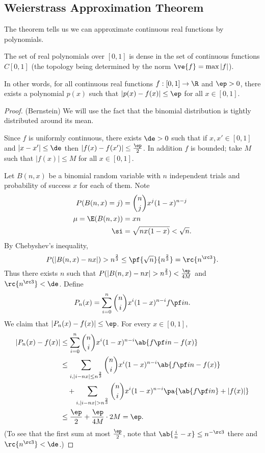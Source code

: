 
\subsection{Weierstrass Approximation Theorem}
The theorem tells us we can approximate continuous real functions by polynomials.
\begin{thm}
The set of real polynomials over $[0,1]$ is dense in the set of continuous functions $C[0,1]$ (the topology being determined by the norm $\ve{f}=\max|f|$).

In other words, for all continuous real functions $f:[0,1]\to \R$ and $\ep>0$, there exists a polynomial $p(x)$ such that $|p(x)-f(x)|\le \ep$ for all $x\in [0,1]$.
\end{thm}
\begin{proof}(Bernstein)
We will use the fact that the binomial distribution is tightly distributed around its mean.

Since $f$ is uniformly continuous, there exists $\de>0$ such that if $x,x'\in[0,1]$ and $|x-x'|\le \de$ then $|f(x)-f(x')|\le \frac{\ep}{2}$. In addition $f$ is bounded; take $M$ such that $|f(x)|\le M$ for all $x\in [0,1]$.

Let $B(n,x)$ be a binomial random variable with $n$ independent trials and probability of success $x$ for each of them. Note
\begin{align*}
P(B(n,x)=j)&=\binom nj x^j(1-x)^{n-j}\\
\mu=\E(B(n,x))&=xn\\
\si&=\sqrt{nx(1-x)}<\sqrt n.
\end{align*}
By Chebyshev's inequality,
\[
P(|B(n,x)-nx|)>n^{\frac 23}\le\pf{\sqrt n}{n^{\frac 23}}=\rc{n^{\rc 3}}.
\]
Thus there exists $n$ such that $P(|B(n,x)-nx|>n^{\frac 23})<\frac{\ep}{4M}$ and $\rc{n^{\rc 3}}<\de$. Define
\[
P_n(x)=\sum_{i=0}^n \binom ni x^i (1-x)^{n-i} f\pf in.
\]
We claim that $|P_n(x)-f(x)|\le \ep$. For every $x\in [0,1]$,
\begin{align*}
|P_n(x)-f(x)|&\le \sum_{i=0}^n \binom nix^i(1-x)^{n-i} \ab{f\pf in -f(x)}\\
&\le \sum_{i,|i-nx|\le n^{\frac 23}}\binom ni x^i (1-x)^{n-i} \ab{f\pf in -f(x)}\\
&\quad +\sum_{i,|i-nx|>n^{\frac 23}} \binom ni x^i (1-x)^{n-i}\pa{
\ab{f\pf in}+
|f(x)|
}\\
&\le \frac{\ep}{2}+\frac{\ep}{4M}\cdot 2M= \ep.
\end{align*}
(To see that the first sum at most $\frac{\ep}{2}$, note that $\ab{\frac{i}n-x}\le n^{-\rc 3}$ there and $\rc{n^{\rc 3}}<\de$.)
\end{proof}
